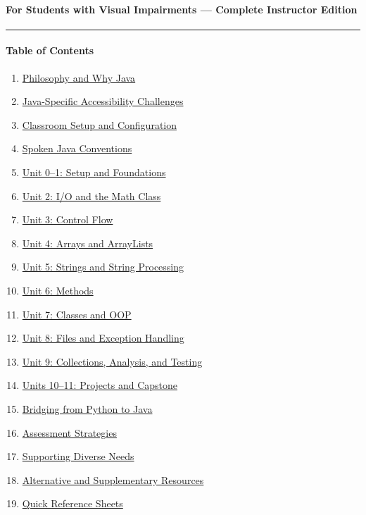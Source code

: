 \documentclass[
  justified,
  openright,
]{tufte-book}
\let\subsection\paragraph
\let\paragraph\paragraph
\let\subsection\paragraph
\let\paragraph\paragraph
\providecommand{\tightlist}{%
  \setlength{\itemsep}{0pt}\setlength{\parskip}{0pt}}
\begin{document}
\subsection{For Students with Visual Impairments --- Complete Instructor
Edition}\label{for-students-with-visual-impairments-complete-instructor-edition-2}

\begin{center}\rule{0.5\linewidth}{0.5pt}\end{center}

\subsection{Table of Contents}\label{table-of-contents-2}

\begin{enumerate}
\def\labelenumi{\arabic{enumi}.}
\tightlist
\item
  \hyperref[philosophy-and-why-java]{Philosophy and Why Java}
\item
  \hyperref[java-specific-accessibility-challenges]{Java-Specific
  Accessibility Challenges}
\item
  \hyperref[classroom-setup-and-configuration]{Classroom Setup and
  Configuration}
\item
  \hyperref[spoken-java-conventions]{Spoken Java Conventions}
\item
  \hyperref[unit-01-setup-and-foundations]{Unit 0--1: Setup and
  Foundations}
\item
  \hyperref[unit-2-io-and-the-math-class]{Unit 2: I/O and the Math
  Class}
\item
  \hyperref[unit-3-control-flow]{Unit 3: Control Flow}
\item
  \hyperref[unit-4-arrays-and-arraylists]{Unit 4: Arrays and ArrayLists}
\item
  \hyperref[unit-5-strings-and-string-processing]{Unit 5: Strings and
  String Processing}
\item
  \hyperref[unit-6-methods]{Unit 6: Methods}
\item
  \hyperref[unit-7-classes-and-oop]{Unit 7: Classes and OOP}
\item
  \hyperref[unit-8-files-and-exception-handling]{Unit 8: Files and
  Exception Handling}
\item
  \hyperref[unit-9-collections-analysis-and-testing]{Unit 9:
  Collections, Analysis, and Testing}
\item
  \hyperref[units-1011-projects-and-capstone]{Units 10--11: Projects and
  Capstone}
\item
  \hyperref[bridging-from-python-to-java]{Bridging from Python to Java}
\item
  \hyperref[assessment-strategies]{Assessment Strategies}
\item
  \hyperref[supporting-diverse-needs]{Supporting Diverse Needs}
\item
  \hyperref[alternative-and-supplementary-resources]{Alternative and
  Supplementary Resources}
\item
  \hyperref[quick-reference-sheets]{Quick Reference Sheets}
\end{enumerate}
\end{document}
